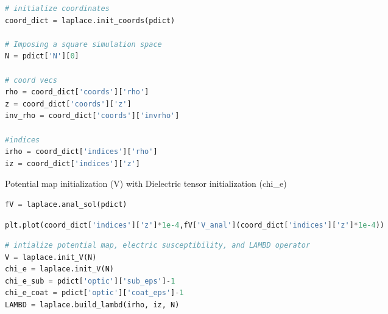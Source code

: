 \begin{spacing}{1.2} \begin{lstlisting}[frame=single, language=Python]
# initialize coordinates
coord_dict = laplace.init_coords(pdict) 

# Imposing a square simulation space
N = pdict['N'][0]

# coord vecs
rho = coord_dict['coords']['rho']
z = coord_dict['coords']['z']
inv_rho = coord_dict['coords']['invrho']

#indices 
irho = coord_dict['indices']['rho']
iz = coord_dict['indices']['z']
\end{lstlisting} \end{spacing}

\noindent Potential map initialization (V) with Dielectric tensor initialization (chi\_e)

\begin{spacing}{1.2} \begin{lstlisting}[frame=single, language=Python]
fV = laplace.anal_sol(pdict)
\end{lstlisting} \end{spacing}

\begin{spacing}{1.2} \begin{lstlisting}[frame=single, language=Python]
plt.plot(coord_dict['indices']['z']*1e-4,fV['V_anal'](coord_dict['indices']['z']*1e-4))
\end{lstlisting} \end{spacing}

\begin{spacing}{1.2} \begin{lstlisting}[frame=single, language=Python]
# intialize potential map, electric susceptibility, and LAMBD operator
V = laplace.init_V(N)
chi_e = laplace.init_V(N)
chi_e_sub = pdict['optic']['sub_eps']-1
chi_e_coat = pdict['optic']['coat_eps']-1
LAMBD = laplace.build_lambd(irho, iz, N)
\end{lstlisting} \end{spacing}

